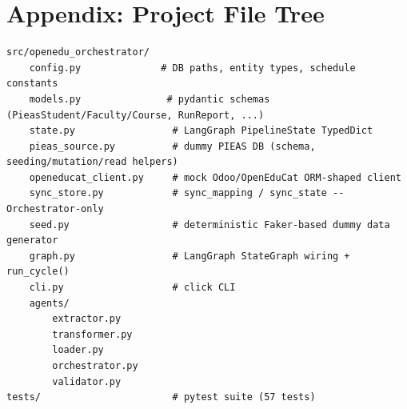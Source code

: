 \documentclass[11pt,a4paper]{article}
\begin{document}
\appendix
\section{Appendix: Project File Tree}

\begin{lstlisting}[style=termstyle,basicstyle=\ttfamily\scriptsize\color{white}]
src/openedu_orchestrator/
    config.py              # DB paths, entity types, schedule constants
    models.py               # pydantic schemas (PieasStudent/Faculty/Course, RunReport, ...)
    state.py                 # LangGraph PipelineState TypedDict
    pieas_source.py          # dummy PIEAS DB (schema, seeding/mutation/read helpers)
    openeducat_client.py     # mock Odoo/OpenEduCat ORM-shaped client
    sync_store.py            # sync_mapping / sync_state -- Orchestrator-only
    seed.py                  # deterministic Faker-based dummy data generator
    graph.py                 # LangGraph StateGraph wiring + run_cycle()
    cli.py                   # click CLI
    agents/
        extractor.py
        transformer.py
        loader.py
        orchestrator.py
        validator.py
tests/                       # pytest suite (57 tests)
\end{lstlisting}
\end{document}
